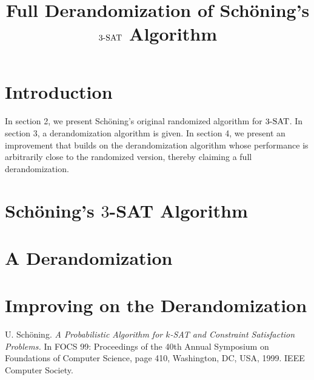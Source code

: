\documentclass{article}
\title{Full Derandomization of Sch\"{o}ning's $\SAT$ Algorithm}
\author{}
\date{}
\newcommand{\SAT}{\textnormal{$3$-SAT}}
\begin{document}
\maketitle

\section{Introduction}
\paragraph{} In section 2, we present Sch\"{o}ning's original randomized algorithm\cite{Schoning99} for $\SAT$. In section 3, a derandomization algorithm is given. In section 4, we present an improvement that builds on the derandomization algorithm whose performance is arbitrarily close to the randomized version, thereby claiming a full derandomization.
\section{Sch\"{o}ning's $3$-SAT Algorithm\cite{Schoning99}}

\section{A Derandomization}

\section{Improving on the Derandomization}

\begin{thebibliography}{9}
U. Sch\"{o}ning.
\textit{A Probabilistic Algorithm for $k$-SAT and Constraint Satisfaction Problems.} In FOCS 99: Proceedings of the 40th Annual Symposium on Foundations of Computer Science, page 410, Washington, DC, USA, 1999. IEEE Computer Society.

\end{thebibliography}
\end{document}
